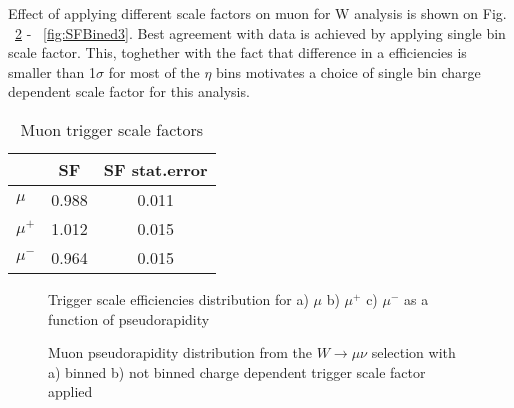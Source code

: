 Effect of applying different scale factors on muon for W analysis is shown on Fig. ~\ref{fig:SFBined1} - ~\ref{fig:SFBined3}. Best agreement with data is achieved by applying single bin scale factor. This, toghether with the fact that difference in a efficiencies is smaller than 1$\sigma$ for most of the $\eta$ bins motivates a choice of single bin charge dependent scale factor for this analysis. 

\begin{table}[!t]
    \caption{Muon trigger scale factors}
	\label{tab:MuonSF}
	\begin{center}
		\begin{tabular}{|l | c | c|}
		\hline
		& SF & SF stat.error\\
		\hline
		\hline
		$\mu$ & 0.988 & 0.011\\
		\hline
		$\mu^{+}$ & 1.012 & 0.015\\
		$\mu^{-}$ & 0.964 & 0.015\\
		\hline
		\end{tabular}
		\end{center}
\end{table}

\begin{figure}[!b]
\endminipage\hfill
{}
\endminipage\hfill
{}%
\endminipage
\caption{Trigger scale efficiencies distribution for a) $\mu$ b) $\mu^{+}$  c) $\mu^{-}$ as a function of pseudorapidity}
\label{fig:MuSF}
\end{figure}

\begin{figure}[!tbp]
\endminipage\hfill
{}
\endminipage\hfill
\caption{Muon pseudorapidity distribution from the $W\to \mu \nu$ selection with a) binned  b) not binned charge dependent trigger scale factor applied}
\label{fig:SFBined1}
\end{figure}

